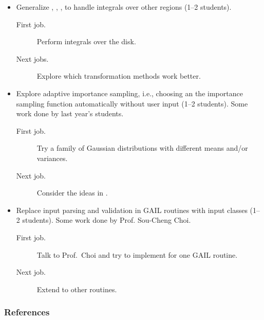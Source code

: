 \documentclass[10pt,compress,xcolor={usenames,dvipsnames}]{beamer} %
\begin{document}
\begin{frame}[allowframebreaks]
\begin{itemize}
\pagebreak

\item Generalize , , , to handle integrals over other regions (1--2 students).
\begin{description}
\item[First job.] Perform integrals over the disk.
\item[Next jobs.]  Explore which transformation methods work better. 
\end{description}


\item Explore adaptive importance sampling, i.e., choosing an the importance sampling function automatically without user input (1--2 students).  Some work done by last year's students.
\begin{description}
\item[First job.] Try a family of Gaussian distributions with different means and/or variances.
\item[Next job.] Consider the ideas in .
\end{description}

\item Replace input parsing and validation in GAIL routines with input classes (1--2 students).  Some work done by Prof. Sou-Cheng Choi.
\begin{description}
	\item[First job.] Talk to Prof.\ Choi and try to implement for one GAIL routine.
	\item[Next job.] Extend to other routines.
\end{description}

\end{itemize}
\end{frame}


\begin{frame}\frametitle{References}

\end{frame}
\end{document}

